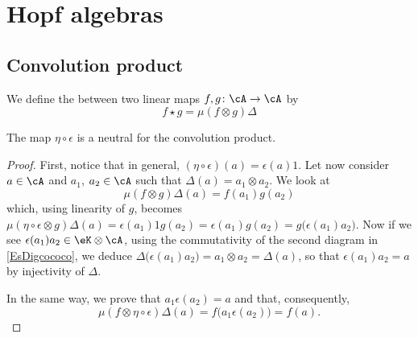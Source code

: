 
\section{Hopf algebras}

\subsection{Convolution product}

We define the  between two linear maps $f,g\colon \cA\to \cA$ by
\begin{equation}
	f\star g=\mu(f\otimes g)\Delta
\end{equation}

\begin{lemma}
	The map $\eta\circ\epsilon$ is a neutral for the convolution product.
\end{lemma}

\begin{proof}
	First, notice that in general, $(\eta\circ\epsilon)(a)=\epsilon(a)1$. Let now consider $a\in\cA$ and $a_1$, $a_2\in\cA$ such that $\Delta(a)=a_1\otimes a_2$. We look at
	\begin{equation}
		\mu(f\otimes g)\Delta(a)=f(a_1)g(a_2)
	\end{equation}
	which, using linearity of $g$, becomes $\mu(\eta\circ\epsilon\otimes g)\Delta(a)=\epsilon(a_1)1g(a_2)=\epsilon(a_1)g(a_2)=g\big( \epsilon(a_1)a_2 \big)$. Now if we see $\epsilon(a_1)a_2\in \eK\otimes\cA$, using the commutativity of the second diagram in \eqref{EsDigcococo}, we deduce $\Delta\big( \epsilon(a_1)a_2 \big)=a_1\otimes a_2=\Delta(a)$, so that $\epsilon(a_1)a_2=a$ by injectivity of $\Delta$.

	In the same way, we prove that $a_1\epsilon(a_2)=a$ and that, consequently,
	\[
		\mu(f\otimes\eta\circ\epsilon)\Delta(a)=f\big( a_1\epsilon(a_2) \big)=f(a).
	\]
\end{proof}

